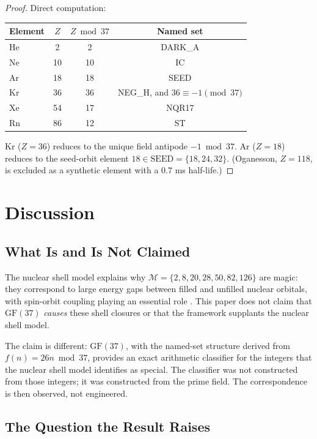 \documentclass[11pt]{article}
\theoremstyle{remark}
\begin{document}
\begin{proof}
Direct computation:
\begin{center}
\begin{tabular}{lccc}
\toprule
Element & $Z$ & $Z\bmod 37$ & Named set\\
\midrule
He & 2  & 2  & DARK\_A\\
Ne & 10 & 10 & IC\\
Ar & 18 & 18 & SEED\\
Kr & 36 & 36 & NEG\_H, and $36\equiv -1\pmod{37}$\\
Xe & 54 & 17 & NQR17\\
Rn & 86 & 12 & ST\\
\bottomrule
\end{tabular}
\end{center}
Kr ($Z=36$) reduces to the unique field antipode $-1\bmod 37$.
Ar ($Z=18$) reduces to the seed-orbit element $18\in\mathrm{SEED}=\{18,24,32\}$.
(Oganesson, $Z=118$, is excluded as a synthetic element with a $0.7$ ms half-life.)
\end{proof}

\section{Discussion}
\label{sec:discussion}

\subsection{What Is and Is Not Claimed}

The nuclear shell model explains why $\mathcal{M}=\{2,8,20,28,50,82,126\}$ are magic:
they correspond to large energy gaps between filled and unfilled nuclear orbitals,
with spin-orbit coupling playing an essential role \cite{goeppert1949,haxel1949}.
This paper does not claim that $\mathrm{GF}(37)$ \emph{causes} these shell closures
or that the framework supplants the nuclear shell model.

The claim is different: $\mathrm{GF}(37)$, with the named-set structure derived from
$f(n)=26n\bmod 37$, provides an exact arithmetic classifier for the integers that the
nuclear shell model identifies as special. The classifier was not constructed from those
integers; it was constructed from the prime field. The correspondence is then observed,
not engineered.

\subsection{The Question the Result Raises}
\end{document}
